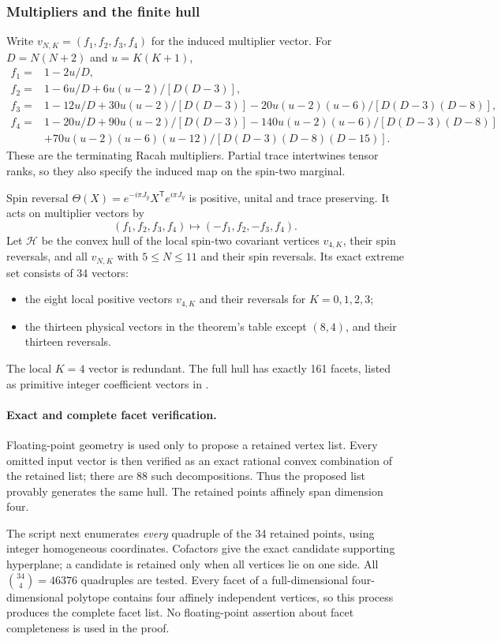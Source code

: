 \documentclass[11pt,a4paper]{article}
\begin{document}
\subsubsection{Multipliers and the finite hull}
Write $v_{N,K}=(f_1,f_2,f_3,f_4)$ for the induced multiplier vector.
For $D=N(N+2)$ and $u=K(K+1)$,
\begin{align*}
 f_1={}&1-2u/D,\\
 f_2={}&1-6u/D+6u(u-2)/[D(D-3)],\\
 f_3={}&1-12u/D+30u(u-2)/[D(D-3)]
               -20u(u-2)(u-6)/[D(D-3)(D-8)],\\
 f_4={}&1-20u/D+90u(u-2)/[D(D-3)]
               -140u(u-2)(u-6)/[D(D-3)(D-8)]\\
       &+70u(u-2)(u-6)(u-12)/[D(D-3)(D-8)(D-15)].
\end{align*}
These are the terminating Racah multipliers.
Partial trace intertwines tensor ranks, so they also specify the
induced map on the spin-two marginal.

Spin reversal $\Theta(X)=e^{-i\pi J_y}X^{\mathsf T}e^{i\pi J_y}$
is positive, unital and trace preserving. It acts on multiplier
vectors by
\[
 (f_1,f_2,f_3,f_4)\mapsto(-f_1,f_2,-f_3,f_4).
\]
Let $\mathcal H$ be the convex hull of the local spin-two covariant
vertices $v_{4,K}$, their spin reversals, and all $v_{N,K}$ with
$5\le N\le11$ and their spin reversals.
Its exact extreme set consists of 34 vectors:
\begin{itemize}
\item the eight local positive vectors $v_{4,K}$ and their reversals
      for $K=0,1,2,3$;
\item the thirteen physical vectors in the theorem's table except
      $(8,4)$, and their thirteen reversals.
\end{itemize}
The local $K=4$ vector is redundant.
The full hull has exactly 161 facets, listed as primitive integer
coefficient vectors in .

\paragraph{Exact and complete facet verification.}
Floating-point geometry is used only to propose a retained vertex
list. Every omitted input vector is then verified as an exact
rational convex combination of the retained list; there are 88
such decompositions. Thus the proposed list provably generates the
same hull. The retained points affinely span dimension four.

The script next enumerates \emph{every} quadruple of the 34 retained
points, using integer homogeneous coordinates. Cofactors give the
exact candidate supporting hyperplane; a candidate is retained only
when all vertices lie on one side. All $\binom{34}{4}=46376$
quadruples are tested. Every facet of a full-dimensional four-dimensional
polytope contains four affinely independent vertices, so this process
produces the complete facet list. No floating-point assertion about
facet completeness is used in the proof.
\end{document}
